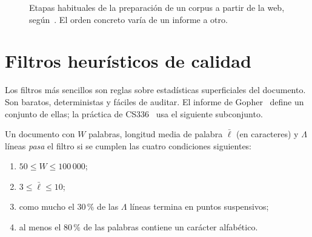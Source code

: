 \begin{figure}[h]
\centering
{}
\caption{Etapas habituales de la preparación de un corpus a partir de la web, según~\cite{cs336a4,refinedweb,fineweb}. El orden concreto varía de un informe a otro.}
\label{fig:proceso}
\end{figure}

\section{Filtros heurísticos de calidad}

Los filtros más sencillos son reglas sobre estadísticas superficiales del documento. Son baratos, deterministas y fáciles de auditar. El informe de Gopher~\cite[apéndice~A]{rae} define un conjunto de ellas; la práctica de CS336~\cite[§2.6]{cs336a4} usa el siguiente subconjunto.

\begin{definicion}\label{def:gopher}
Un documento con $W$ palabras, longitud media de palabra $\bar{\ell}$ (en caracteres) y $\Lambda$ líneas \emph{pasa} el filtro si se cumplen las cuatro condiciones siguientes:
\begin{enumerate}
  \item $50\le W\le 100\,000$;
  \item $3\le\bar{\ell}\le 10$;
  \item como mucho el $30\,\%$ de las $\Lambda$ líneas termina en puntos suspensivos;
  \item al menos el $80\,\%$ de las palabras contiene un carácter alfabético.
\end{enumerate}
\end{definicion}


